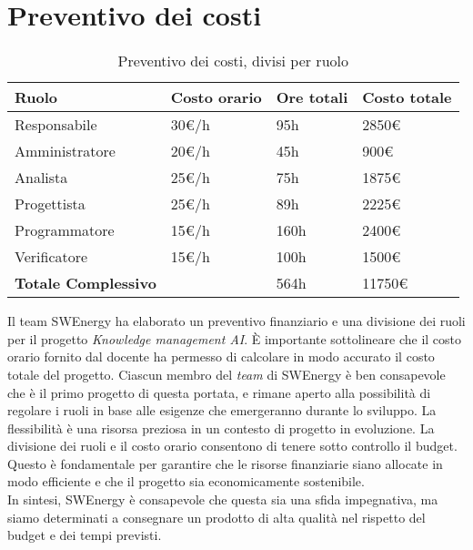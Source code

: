 \section{Preventivo dei costi}

\begin{table}[H]
	\renewcommand{\arraystretch}{1.5}
	\centering
	\begin{tabular}{l|l|l|l}
		\textbf{Ruolo} & \textbf{Costo orario} & \textbf{Ore totali} & 
		\textbf{Costo totale} \\ \hline
		\toprule
		Responsabile				& 30€/h & 95h  & 2850€			\\
		Amministratore				& 20€/h & 45h  & 900€				\\
		Analista					& 25€/h & 75h  & 1875€			\\
		Progettista					& 25€/h & 89h  & 2225€			\\
		Programmatore				& 15€/h & 160h & 2400€			\\
		Verificatore				& 15€/h & 100h & 1500€			\\
		\midrule
		\textbf{Totale Complessivo} &	  & 564h & 11750€			\\
	\end{tabular}
	\caption{Preventivo dei costi, divisi per ruolo}

\end{table}

Il team SWEnergy ha elaborato un preventivo finanziario e una divisione dei
ruoli per il progetto \textit{Knowledge management AI}. È importante 
sottolineare che il costo orario fornito dal docente ha permesso di calcolare 
in modo accurato il costo totale del progetto. 
Ciascun membro del \textit{team} di SWEnergy è ben consapevole che è il primo
progetto di questa portata, e 
rimane aperto alla possibilità di regolare i ruoli in base alle esigenze che 
emergeranno durante lo sviluppo. La flessibilità è una risorsa preziosa in un 
contesto di progetto in evoluzione.
La divisione dei ruoli e il costo orario consentono di tenere sotto controllo il
budget. Questo è fondamentale per garantire che le risorse finanziarie siano 
allocate in modo efficiente e che il progetto sia economicamente sostenibile. \\
In sintesi, SWEnergy è consapevole che questa sia una sfida impegnativa, ma
siamo determinati a consegnare un prodotto di alta qualità nel rispetto del
budget e dei tempi previsti. 
